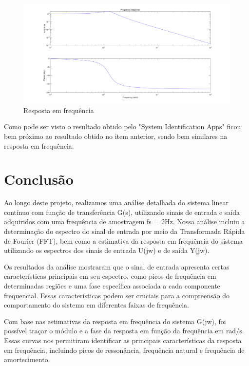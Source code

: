 \documentclass[10pt]{article}
\begin{document}
\begin{figure}[h]
    \centering
    \includegraphics[scale=0.24]{si4.png}
    \caption{Resposta em frequência}
\end{figure}

\quad Como pode ser visto o resultado obtido pelo "System Identification Apps" ficou bem próximo ao resultado obtido no item anterior,
sendo bem similares na resposta em frequência.

\newpage

\section{Conclusão}

\quad Ao longo deste projeto, realizamos uma análise detalhada do sistema linear contínuo com função de transferência G(s),
utilizando sinais de entrada e saída adquiridos com uma frequência de amostragem fs = 2Hz.
Nossa análise incluiu a determinação do espectro do sinal de entrada por meio da Transformada Rápida de Fourier (FFT),
bem como a estimativa da resposta em frequência do sistema utilizando os espectros dos sinais de entrada U(jw) e de saída Y(jw).

\quad Os resultados da análise mostraram que o sinal de entrada apresenta certas características principais em seu espectro,
como picos de frequência em determinadas regiões e uma fase específica associada a cada componente frequencial.
Essas características podem ser cruciais para a compreensão do comportamento do sistema em diferentes faixas de frequência.

\quad Com base nas estimativas da resposta em frequência do sistema G(jw),
foi possível traçar o módulo e a fase da resposta em função da frequência em rad/s.
Essas curvas nos permitiram identificar as principais características da resposta em frequência,
incluindo picos de ressonância, frequência natural e frequência de amortecimento.
\end{document}
